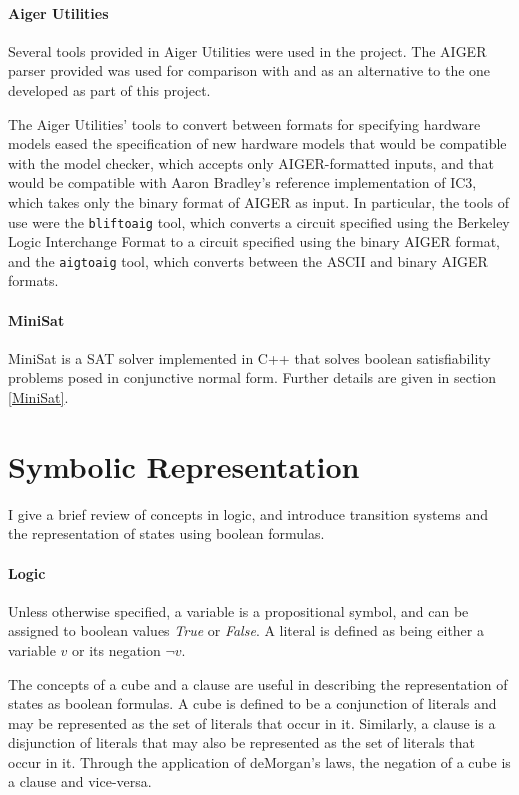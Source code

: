 \documentclass[12pt,a4paper,twoside,openright]{report}
\begin{document}
\paragraph{Aiger Utilities}{
Several tools provided in Aiger Utilities were used in the project. The
AIGER parser provided was used for comparison with and as an alternative
to the one developed as part of this project. 

The Aiger Utilities' tools to convert between formats for specifying
hardware models eased the specification of new hardware models that would
be compatible with the model checker, which accepts only AIGER-formatted inputs,
and that would be compatible with  Aaron Bradley's reference implementation of IC3,
which takes only the binary format of AIGER as input.
In particular, the tools of use were
the {\tt bliftoaig}
tool, which converts a circuit specified using the Berkeley Logic Interchange Format
to a circuit specified using the binary AIGER format, and the {\tt aigtoaig} tool,
which converts between the ASCII and binary AIGER formats.
}

\paragraph{MiniSat}{
MiniSat is a SAT solver implemented in C++ that solves boolean satisfiability problems
posed in conjunctive normal form. Further details are given in section \ref{MiniSat}.
}

\section{Symbolic Representation}
I give a brief review of concepts in logic, and introduce transition systems and the
representation of states using boolean formulas.

\paragraph{Logic}{
Unless otherwise specified, a variable is a propositional symbol,
and can be assigned to boolean values {\it True} or {\it False}.
A literal is defined as being either a variable $v$ or its negation $\neg v$.

The concepts of a cube and a clause are useful in describing the
representation of states as boolean formulas.
A cube is defined to be a conjunction of literals and may be represented as the set
of literals that occur in it. Similarly, a clause is a disjunction of literals that
may also be represented as the set of literals that occur in it. Through the
application of deMorgan's laws, the negation of a cube is a clause and vice-versa.}
\end{document}
